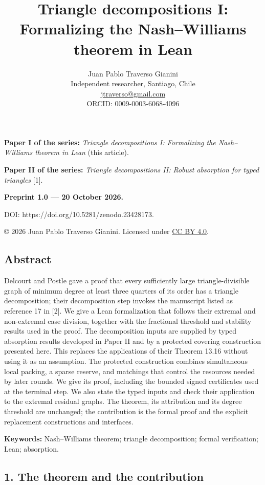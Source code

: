 \documentclass[english,11pt,a4paper]{article}
\title{Triangle decompositions I: Formalizing the Nash–Williams theorem in Lean}
\author{Juan Pablo Traverso Gianini\\
\small Independent researcher, Santiago, Chile\\
\small \href{mailto:jtraverso@gmail.com}{jtraverso@gmail.com}\\
\small ORCID: 0009-0003-6068-4096}
\date{}
\begin{document}
\raggedbottom
\maketitle
\textbf{Paper I of the series:} \emph{Triangle decompositions I: Formalizing the Nash--Williams theorem in Lean} (this article).

\textbf{Paper II of the series:} \emph{Triangle decompositions II: Robust absorption for typed triangles} {[}1{]}.

\textbf{Preprint 1.0 --- 20 October 2026.}

DOI: https://doi.org/10.5281/zenodo.23428173.

© 2026 Juan Pablo Traverso Gianini. Licensed under \href{https://creativecommons.org/licenses/by/4.0/}{CC BY 4.0}.

\subsection{Abstract}\label{abstract}

Delcourt and Postle gave a proof that every sufficiently large triangle-divisible graph of minimum degree at least three quarters of its order has a triangle decomposition; their decomposition step invokes the manuscript listed as reference 17 in {[}2{]}. We give a Lean formalization that follows their extremal and non-extremal case division, together with the fractional threshold and stability results used in the proof. The decomposition inputs are supplied by typed absorption results developed in Paper II and by a protected covering construction presented here. This replaces the applications of their Theorem 13.16 without using it as an assumption. The protected construction combines simultaneous local packing, a sparse reserve, and matchings that control the resources needed by later rounds. We give its proof, including the bounded signed certificates used at the terminal step. We also state the typed inputs and check their application to the extremal residual graphs. The theorem, its attribution and its degree threshold are unchanged; the contribution is the formal proof and the explicit replacement constructions and interfaces.

\textbf{Keywords:} Nash--Williams theorem; triangle decomposition; formal verification; Lean; absorption.

\subsection{1. The theorem and the contribution}\label{the-theorem-and-the-contribution}
\end{document}
